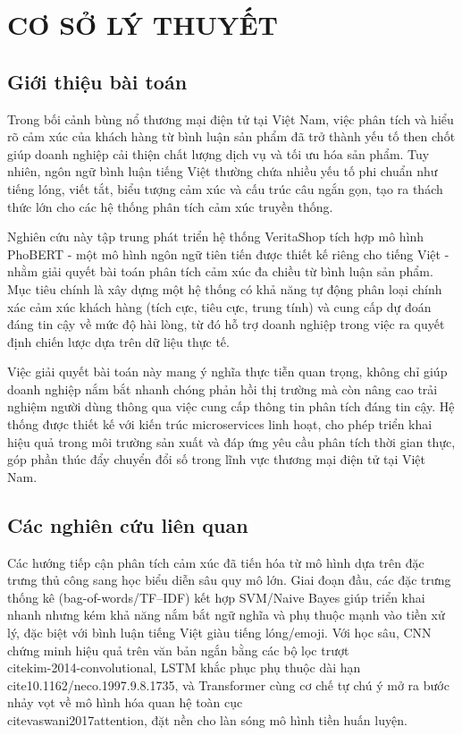 \newpage
%
%
\section{CƠ SỞ LÝ THUYẾT}\label{sec:theory_support}
\subsection{Giới thiệu bài toán}

Trong bối cảnh bùng nổ thương mại điện tử tại Việt Nam, việc phân tích và hiểu rõ cảm xúc của khách hàng từ bình luận sản phẩm đã trở thành yếu tố then chốt giúp doanh nghiệp cải thiện chất lượng dịch vụ và tối ưu hóa sản phẩm. Tuy nhiên, ngôn ngữ bình luận tiếng Việt thường chứa nhiều yếu tố phi chuẩn như tiếng lóng, viết tắt, biểu tượng cảm xúc và cấu trúc câu ngắn gọn, tạo ra thách thức lớn cho các hệ thống phân tích cảm xúc truyền thống.

Nghiên cứu này tập trung phát triển hệ thống VeritaShop tích hợp mô hình PhoBERT - một mô hình ngôn ngữ tiên tiến được thiết kế riêng cho tiếng Việt - nhằm giải quyết bài toán phân tích cảm xúc đa chiều từ bình luận sản phẩm. Mục tiêu chính là xây dựng một hệ thống có khả năng tự động phân loại chính xác cảm xúc khách hàng (tích cực, tiêu cực, trung tính) và cung cấp dự đoán đáng tin cậy về mức độ hài lòng, từ đó hỗ trợ doanh nghiệp trong việc ra quyết định chiến lược dựa trên dữ liệu thực tế.

Việc giải quyết bài toán này mang ý nghĩa thực tiễn quan trọng, không chỉ giúp doanh nghiệp nắm bắt nhanh chóng phản hồi thị trường mà còn nâng cao trải nghiệm người dùng thông qua việc cung cấp thông tin phân tích đáng tin cậy. Hệ thống được thiết kế với kiến trúc microservices linh hoạt, cho phép triển khai hiệu quả trong môi trường sản xuất và đáp ứng yêu cầu phân tích thời gian thực, góp phần thúc đẩy chuyển đổi số trong lĩnh vực thương mại điện tử tại Việt Nam.
\subsection{Các nghiên cứu liên quan}

Các hướng tiếp cận phân tích cảm xúc đã tiến hóa từ mô hình dựa trên đặc trưng thủ công sang học biểu diễn sâu quy mô lớn. Giai đoạn đầu, các đặc trưng thống kê (bag-of-words/TF–IDF) kết hợp SVM/Naive Bayes giúp triển khai nhanh nhưng kém khả năng nắm bắt ngữ nghĩa và phụ thuộc mạnh vào tiền xử lý, đặc biệt với bình luận tiếng Việt giàu tiếng lóng/emoji. Với học sâu, CNN chứng minh hiệu quả trên văn bản ngắn bằng các bộ lọc trượt \\cite{kim-2014-convolutional}, LSTM khắc phục phụ thuộc dài hạn \\cite{10.1162/neco.1997.9.8.1735}, và Transformer cùng cơ chế tự chú ý mở ra bước nhảy vọt về mô hình hóa quan hệ toàn cục \\cite{vaswani2017attention}, đặt nền cho làn sóng mô hình tiền huấn luyện.

